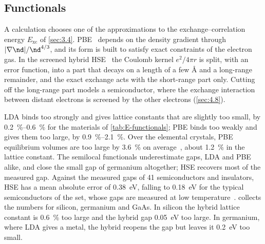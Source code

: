 \subsection{Functionals}

A calculation chooses one of the approximations to the exchange--correlation energy $E_{\mathrm{xc}}$ of \cref{sec:3.4}. PBE~\cite{perdew1996generalized} depends on the density gradient through $|\nabla\nd|/\nd^{4/3}$, and its form is built to satisfy exact constraints of the electron gas. In the screened hybrid HSE~\cite{heyd2003hybrid} the Coulomb kernel $e^2/4\pi r$ is split, with an error function, into a part that decays on a length of a few \AA{} and a long-range remainder, and the exact exchange acts with the short-range part only. Cutting off the long-range part models a semiconductor, where the exchange interaction between distant electrons is screened by the other electrons (\cref{sec:4.8}).

LDA binds too strongly and gives lattice constants that are slightly too small, by \SIrange{0.2}{0.6}{\percent} for the materials of \cref{tab:E-functionals}; PBE binds too weakly and gives them too large, by \SIrange{0.9}{2.1}{\percent}. Over the elemental crystals, PBE equilibrium volumes are too large by \SI{3.6}{\percent} on average~\cite[Table~IV]{lejaeghere2014error}, about \SI{1.2}{\percent} in the lattice constant. The semilocal functionals underestimate gaps, LDA and PBE alike, and close the small gap of germanium altogether; HSE recovers most of the measured gap. Against the measured gaps of 41 semiconductors and insulators, HSE has a mean absolute error of \SI{0.38}{eV}, falling to \SI{0.18}{eV} for the typical semiconductors of the set, whose gaps are measured at low temperature~\cite[Table~I and text]{garza2016predicting}.  collects the numbers for silicon, germanium and GaAs. In silicon the hybrid lattice constant is \SI{0.6}{\percent} too large and the hybrid gap \SI{0.05}{eV} too large. In germanium, where LDA gives a metal, the hybrid reopens the gap but leaves it \SI{0.2}{eV} too small.

